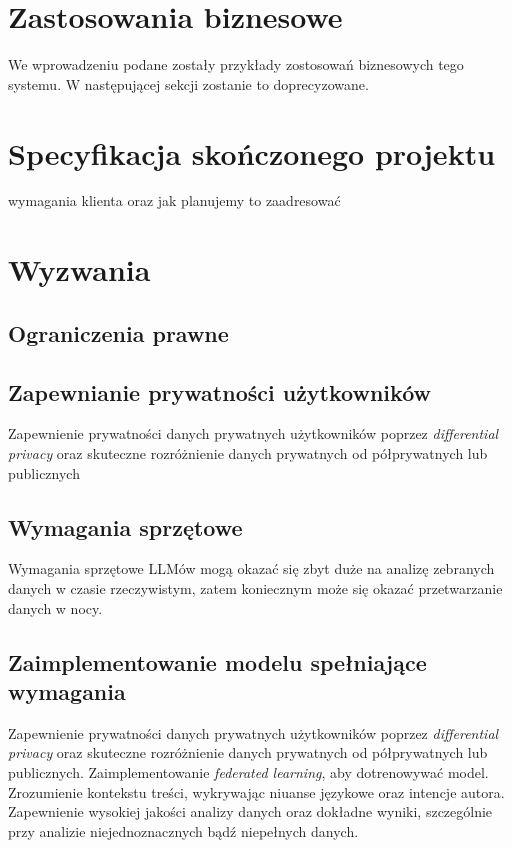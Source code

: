 \documentclass[12pt]{article}
\begin{document}
\section*{Zastosowania biznesowe}

We wprowadzeniu podane zostały przykłady zostosowań biznesowych tego systemu. W następującej sekcji zostanie to doprecyzowane.


\section*{Specyfikacja skończonego projektu}
wymagania klienta oraz jak planujemy to zaadresować

\section*{Wyzwania}
\subsection{Ograniczenia prawne}

\subsection{Zapewnianie prywatności użytkowników}
Zapewnienie prywatności danych prywatnych użytkowników poprzez \emph{differential privacy} oraz skuteczne rozróżnienie danych prywatnych od półprywatnych lub publicznych

\subsection{Wymagania sprzętowe}
Wymagania sprzętowe LLMów mogą okazać się zbyt duże na analizę zebranych danych w czasie rzeczywistym, zatem koniecznym może się okazać przetwarzanie danych w nocy.  

\subsection{Zaimplementowanie modelu spełniające wymagania}
Zapewnienie prywatności danych prywatnych użytkowników poprzez \emph{differential privacy} oraz skuteczne rozróżnienie danych prywatnych od półprywatnych lub publicznych.
Zaimplementowanie \emph{federated learning}, aby dotrenowywać model.
Zrozumienie kontekstu treści, wykrywając niuanse językowe oraz intencje autora.
Zapewnienie wysokiej jakości analizy danych oraz dokładne wyniki, szczególnie przy analizie niejednoznacznych bądź niepełnych danych.
\end{document}
